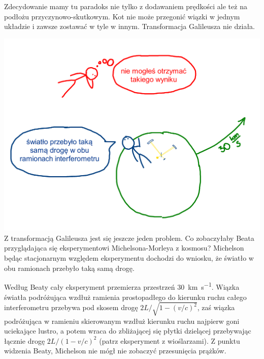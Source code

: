 \documentclass[10pt,twocolumn,fleqn,polish]{article}
\begin{document}
Zdecydowanie mamy tu paradoks nie tylko z dodawaniem prędkości ale też
na podłożu przyczynowo-skutkowym. Kot nie może przegonić wiązki w jednym
układzie i zawsze zostawać w tyle w innym.
Transformacja Galileusza nie działa.
\newpage

\noindent\includegraphics[width=1\linewidth]{pages/STA-page16}
Z transformacją Galileusza jest się jeszcze jeden problem.
Co zobaczyłaby Beata przyglądająca się eksperymentowi Michelsona-Morleya z kosmosu?
Michelson będąc stacjonarnym względem eksperymentu dochodzi do wniosku, że
światło w obu ramionach przebyło taką samą drogę.

Według Beaty cały eksperyment przemierza przestrzeń \SI{30}{\kilo\metre\per\second}.
Wiązka światła podróżująca wzdłuż ramienia prostopadłego do kierunku ruchu całego interferometru
przebywa pod skosem drogę ${2L}/{\sqrt{1-(v/c)^2}}$, zaś wiązka podróżująca
w ramieniu skierowanym wzdłuż kierunku ruchu najpierw goni uciekające lustro, a potem
wraca do zbliżającej się płytki dzielącej przebywając łącznie drogę
${2L}/{(1-v/c)^2}$ (patrz eksperyment z wioślarzami).
Z punktu widzenia Beaty, Michelson nie mógł nie zobaczyć przesunięcia prążków.
\newpage
\end{document}
